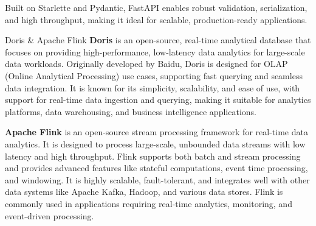 Built on Starlette and Pydantic, FastAPI enables robust validation, serialization, and high throughput, making it ideal for scalable, production-ready applications.


\secc Doris \& Apache Flink
{\bf Doris} is an open-source, real-time analytical database that focuses on providing high-performance, low-latency data analytics for large-scale data workloads. Originally developed by Baidu, Doris is designed for OLAP (Online Analytical Processing) use cases, supporting fast querying and seamless data integration. It is known for its simplicity, scalability, and ease of use, with support for real-time data ingestion and querying, making it suitable for analytics platforms, data warehousing, and business intelligence applications.

{\bf Apache Flink} is an open-source stream processing framework for real-time data analytics. It is designed to process large-scale, unbounded data streams with low latency and high throughput. Flink supports both batch and stream processing and provides advanced features like stateful computations, event time processing, and windowing. It is highly scalable, fault-tolerant, and integrates well with other data systems like Apache Kafka, Hadoop, and various data stores. Flink is commonly used in applications requiring real-time analytics, monitoring, and event-driven processing.